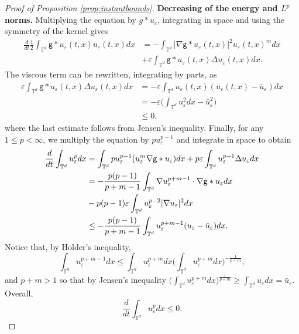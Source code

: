 \documentclass[11pt]{article}
\numberwithin{equation}{section} %
\newcommand{\T}{{\mathbb{T}}}
\newcommand{\g}{{\mathsf{g}}}
\newcommand{\eps}{\varepsilon}
\newcommand{\D}{\Delta}
\newcommand{\ep}{\varepsilon}
\let\div\relax
\DeclareMathOperator{\div}{\mathsf{div}}
\def \hal{\frac{1}{2}}
\def \ep{\varepsilon}
\def\nab{\nabla}
\begin{document}
\begin{proof}[Proof of Proposition \ref{prop:instantbounds}]
\bigbreak
\textbf{Decreasing of the energy and $L^p$ norms.} Multiplying the equation by $g\ast u_{\eps}$, integrating in space and using the symmetry of the kernel gives
\begin{align*}
    \frac{d}{dt}\hal\int_{\T^d}\g\ast u_\ep(t,x) u_\ep(t,x) dx &=  -\int_{\T^d} |\nab \g \ast u_\ep(t,x)|^2 u_\ep(t,x)^m dx \\
    &+ \ep \int_{\T^d} \g\ast u_\ep(t,x) \D u_\ep(t,x) dx.
\end{align*}
The viscous term can be rewritten, integrating by parts, as
\begin{align*}
    \ep \int_{\T^d} \g\ast u_\ep(t,x) \D u_\ep(t,x) dx &= -\ep \int_{\T^d} u_\ep(t,x) (u_\ep(t,x) - \bar u_\ep) dx  \\
    &= -\ep \bigg(\int_{\T^d} u_\ep^2dx - \bar u_\ep^2\bigg) \\
    &\le 0,
\end{align*}
where the last estimate follows from Jensen's inequality. Finally, for any $1\le p <\infty$, we multiply the equation by $p u_{\eps}^{p-1}$ and integrate in space to obtain
\begin{align*}
    \frac{d}{dt}\int_{\T^d} u_\ep^p dx &= \int_{\T^d}pu_\ep^{p-1} \div(u_\ep^m\nab\g\ast u_\ep)dx+ p\ep \int_{\T^d} u_\ep^{p-1}\D u_\ep dx \\
    &= -\frac{p(p-1)}{p+m-1} \int_{\T^d} \nab u_\ep^{p+m-1}\cdot\nab\g\ast u_\ep dx \\
    &-p(p-1)\ep \int_{\T^d} u_\ep^{p-2}|\nab u_\ep|^2 dx \\
    &\le-\frac{p(p-1)}{p+m-1}\int_{\T^d} u_\ep^{p+m-1}(u_\ep -\bar u_\ep) dx.
\end{align*}
Notice that, by Holder's inequality,
\begin{equation}\label{ineq:Jensen}
    \int_{\T^d} u_\ep^{p+m-1} dx \le \int_{\T^d} u_\ep^{p+m}dx\bigg(\int_{\T^d}u_\ep^{p+m}dx\bigg)^{-\frac{1}{p+m}},
\end{equation}
and $p+m >1$ so that by Jensen's inequality $\bigg(\int_{\T^d}u_\ep^{p+m}dx\bigg)^{\frac{1}{p+m}}\ge  \int_{\T^d} u_\ep dx = \bar u_\ep$. Overall,
\begin{equation*}
     \frac{d}{dt}\int_{\T^d} u_\ep^p dx \le 0.
\end{equation*}
\end{proof}
\end{document}
